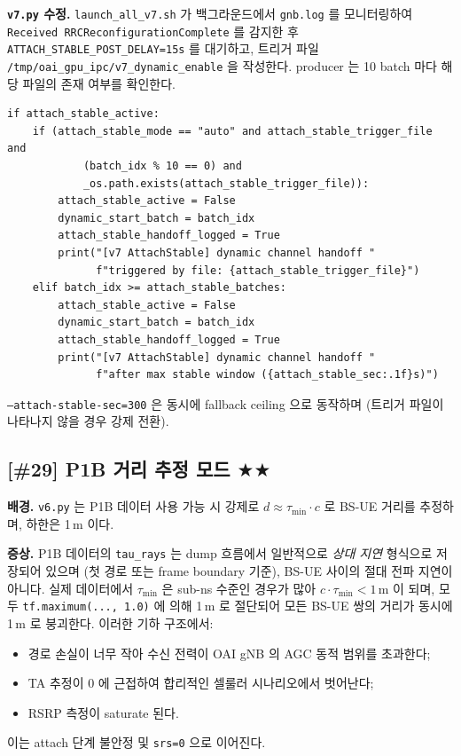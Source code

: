 \documentclass[11pt,a4paper]{article}
\newcommand{\stwo}{\textcolor{starcolor}{$\bigstar\bigstar$}}
\newcommand{\vsix}{\texttt{v6.py}}
\newcommand{\vseven}{\texttt{v7.py}}
\newcommand{\bugitem}[3]{%
  \subsection{[\##1] #2 \hfill #3}%
  \vspace{-0.5em}%
}
\begin{document}
\textbf{\vseven{} 수정.} \texttt{launch\_all\_v7.sh} 가 백그라운드에서
\texttt{gnb.log} 를 모니터링하여 \texttt{Received RRCReconfigurationComplete}
를 감지한 후 \texttt{ATTACH\_STABLE\_POST\_DELAY=15s} 를 대기하고,
트리거 파일 \texttt{/tmp/oai\_gpu\_ipc/v7\_dynamic\_enable} 을 작성한다.
producer 는 10 batch 마다 해당 파일의 존재 여부를 확인한다.
\begin{lstlisting}[caption={v7.py: lines 2170--2184}]
if attach_stable_active:
    if (attach_stable_mode == "auto" and attach_stable_trigger_file and
            (batch_idx % 10 == 0) and
            _os.path.exists(attach_stable_trigger_file)):
        attach_stable_active = False
        dynamic_start_batch = batch_idx
        attach_stable_handoff_logged = True
        print("[v7 AttachStable] dynamic channel handoff "
              f"triggered by file: {attach_stable_trigger_file}")
    elif batch_idx >= attach_stable_batches:
        attach_stable_active = False
        dynamic_start_batch = batch_idx
        attach_stable_handoff_logged = True
        print("[v7 AttachStable] dynamic channel handoff "
              f"after max stable window ({attach_stable_sec:.1f}s)")
\end{lstlisting}
\texttt{--attach-stable-sec=300} 은 동시에 fallback ceiling 으로 동작하며
(트리거 파일이 나타나지 않을 경우 강제 전환).

\bugitem{29}{P1B 거리 추정 모드}{\stwo}

\textbf{배경.} \vsix{} 는 P1B 데이터 사용 가능 시 강제로
$d \approx \tau_{\min} \cdot c$ 로 BS-UE 거리를 추정하며, 하한은 1\,m 이다.

\textbf{증상.} P1B 데이터의 \texttt{tau\_rays} 는 dump 흐름에서 일반적으로
\textit{상대 지연} 형식으로 저장되어 있으며 (첫 경로 또는 frame boundary
기준), BS-UE 사이의 절대 전파 지연이 아니다. 실제 데이터에서
$\tau_{\min}$ 은 sub-ns 수준인 경우가 많아
$c \cdot \tau_{\min} < 1\,\text{m}$ 이 되며, 모두
\texttt{tf.maximum(..., 1.0)} 에 의해 1\,m 로 절단되어 모든 BS-UE 쌍의
거리가 동시에 1\,m 로 붕괴한다. 이러한 기하 구조에서:
\begin{itemize}
  \item 경로 손실이 너무 작아 수신 전력이 OAI gNB 의 AGC 동적 범위를 초과한다;
  \item TA 추정이 0 에 근접하여 합리적인 셀룰러 시나리오에서 벗어난다;
  \item RSRP 측정이 saturate 된다.
\end{itemize}
이는 attach 단계 불안정 및 \texttt{srs=0} 으로 이어진다.
\end{document}
